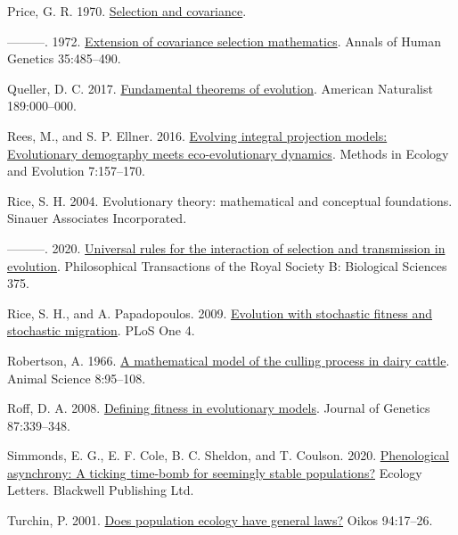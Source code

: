 \documentclass[
]{article}
\newlength{\cslhangindent}
\newenvironment{CSLReferences}[2] %
 {\begin{list}{}{%
  \setlength{\itemindent}{0pt}
  \setlength{\leftmargin}{0pt}
  \setlength{\parsep}{0pt}
  \ifodd #1
   \setlength{\leftmargin}{\cslhangindent}
   \setlength{\itemindent}{-1\cslhangindent}
  \fi
  \setlength{\itemsep}{#2\baselineskip}}}
 {\end{list}}
\begin{document}
\begin{CSLReferences}{0}{0}
Price, G. R. 1970. \href{https://doi.org/10.1038/227520a0}{{Selection
and covariance}}.

---------. 1972.
\href{https://doi.org/10.1111/j.1469-1809.1957.tb01874.x}{{Extension of
covariance selection mathematics}}. Annals of Human Genetics
35:485--490.

Queller, D. C. 2017. \href{https://doi.org/10.1086/690937}{{Fundamental
theorems of evolution}}. American Naturalist 189:000--000.

Rees, M., and S. P. Ellner. 2016.
\href{https://doi.org/10.1111/2041-210X.12487}{Evolving integral
projection models: Evolutionary demography meets eco-evolutionary
dynamics}. Methods in Ecology and Evolution 7:157--170.

Rice, S. H. 2004. {Evolutionary theory: mathematical and conceptual
foundations}. Sinauer Associates Incorporated.

---------. 2020.
\href{https://doi.org/10.1098/rstb.2019.0353}{{Universal rules for the
interaction of selection and transmission in evolution}}. Philosophical
Transactions of the Royal Society B: Biological Sciences 375.

Rice, S. H., and A. Papadopoulos. 2009.
\href{https://doi.org/10.1371/journal.pone.0007130}{{Evolution with
stochastic fitness and stochastic migration}}. PLoS One 4.

Robertson, A. 1966. \href{https://doi.org/10.1017/S0003356100037752}{{A
mathematical model of the culling process in dairy cattle}}. Animal
Science 8:95--108.

Roff, D. A. 2008.
\href{https://doi.org/10.1007/s12041-008-0056-9}{{Defining fitness in
evolutionary models}}. Journal of Genetics 87:339--348.

Simmonds, E. G., E. F. Cole, B. C. Sheldon, and T. Coulson. 2020.
\href{https://doi.org/10.1111/ele.13603}{Phenological asynchrony: A
ticking time-bomb for seemingly stable populations?} Ecology Letters.
Blackwell Publishing Ltd.

Turchin, P. 2001.
\href{https://doi.org/10.1034/j.1600-0706.2001.11310.x}{Does population
ecology have general laws?} Oikos 94:17--26.


\end{CSLReferences}
\end{document}
